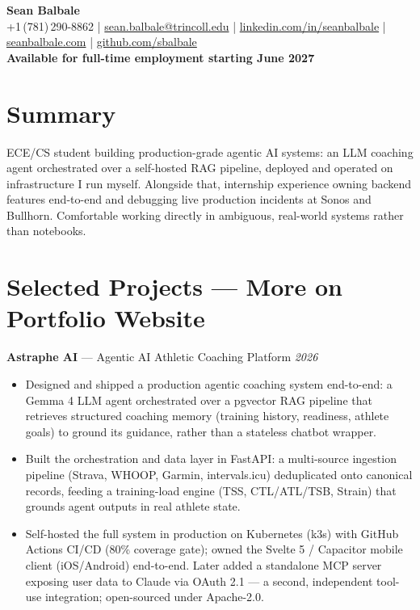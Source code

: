 \documentclass[10pt, letterpaper]{article}
\begin{document}
\small

\begin{center}
  {\Large \textbf{Sean Balbale}}\\[1pt]
  \small
  +1\,(781)\,290-8862 \;|\;
  \href{mailto:sean.balbale@trincoll.edu}{sean.balbale@trincoll.edu} \;|\;
  \href{https://www.linkedin.com/in/seanbalbale/}{linkedin.com/in/seanbalbale} \;|\;
  \href{https://seanbalbale.com}{seanbalbale.com} \;|\;
  \href{https://github.com/sbalbale}{github.com/sbalbale}\\[3pt]
  \textbf{Available for full-time employment starting June 2027}
\end{center}

\section{Summary}

\noindent
ECE/CS student building production-grade agentic AI systems: an LLM coaching agent
orchestrated over a self-hosted RAG pipeline, deployed and operated on infrastructure I
run myself. Alongside that, internship experience owning backend features end-to-end and
debugging live production incidents at Sonos and Bullhorn. Comfortable working directly
in ambiguous, real-world systems rather than notebooks.

\section{Selected Projects --- More on Portfolio Website}

\noindent
\textbf{Astraphe AI} --- Agentic AI Athletic Coaching Platform
\hfill \textit{2026}
\begin{itemize}
  \item Designed and shipped a production agentic coaching system end-to-end: a Gemma 4
    LLM agent orchestrated over a pgvector RAG pipeline that retrieves structured coaching
    memory (training history, readiness, athlete goals) to ground its guidance, rather than
    a stateless chatbot wrapper.
  \item Built the orchestration and data layer in FastAPI: a multi-source ingestion
    pipeline (Strava, WHOOP, Garmin, intervals.icu) deduplicated onto canonical records,
    feeding a training-load engine (TSS, CTL/ATL/TSB, Strain) that grounds agent outputs
    in real athlete state.
  \item Self-hosted the full system in production on Kubernetes (k3s) with GitHub Actions
    CI/CD (80\% coverage gate); owned the Svelte 5 / Capacitor mobile client (iOS/Android)
    end-to-end. Later added a standalone MCP server exposing user data to Claude via
    OAuth 2.1 --- a second, independent tool-use integration; open-sourced under Apache-2.0.
\end{itemize}
\end{document}
